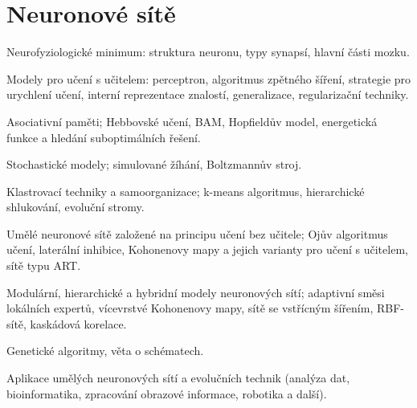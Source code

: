 \newpage
\section{Neuronové sítě}
\begin{pozadavky}
\begin{pitemize}
\item Neurofyziologické minimum: struktura neuronu, typy synapsí, hlavní části mozku.
\item Modely pro učení s učitelem: perceptron, algoritmus zpětného šíření, strategie pro urychlení učení, interní reprezentace znalostí, generalizace, regularizační techniky.
\item Asociativní paměti; Hebbovské učení, BAM, Hopfieldův model, energetická funkce a hledání suboptimálních řešení.
\item Stochastické modely; simulované žíhání, Boltzmannův stroj.
\item Klastrovací techniky a samoorganizace; k-means algoritmus, hierarchické shlukování, evoluční stromy.
\item Umělé neuronové sítě založené na principu učení bez učitele; Ojův algoritmus učení, laterální inhibice, Kohonenovy mapy a jejich varianty pro učení s učitelem, sítě typu ART.
\item Modulární, hierarchické a hybridní modely neuronových sítí; adaptivní směsi lokálních expertů, vícevrstvé Kohonenovy mapy, sítě se vstřícným šířením, RBF-sítě, kaskádová korelace.
\item Genetické algoritmy, věta o schématech.
\item Aplikace umělých neuronových sítí a evolučních technik (analýza dat, bioinformatika, zpracování obrazové informace, robotika a další).
\end{pitemize}
\end{pozadavky}








